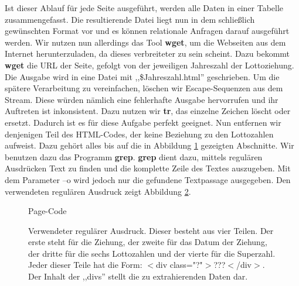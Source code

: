\documentclass[11pt,a4paper]{article}
\newcommand{\extname}[1]{\mbox{\textbf{#1}}}
\begin{document}
Ist dieser Ablauf für jede Seite ausgeführt, werden alle Daten in einer Tabelle zusammengefasst. Die resultierende Datei liegt nun in dem schließlich gewünschten Format vor und es können relationale Anfragen darauf ausgeführt werden.
\newline
\newline
Wir nutzen nun allerdings das Tool \extname{wget}, um die Webseiten aus dem Internet herunterzuladen, da dieses verbreiteter zu sein scheint. Dazu bekommt \extname{wget} die URL der Seite, gefolgt von der jeweiligen Jahreszahl der Lottoziehung. Die Ausgabe wird in eine Datei mit ,,\$Jahreszahl.html'' geschrieben.
\newline
\newline
Um die spätere Verarbeitung zu vereinfachen, löschen wir Escape-Sequenzen aus dem Stream. Diese würden nämlich eine fehlerhafte Ausgabe hervorrufen und ihr Auftreten ist inkonsistent. Dazu nutzen wir \extname{tr}, das einzelne Zeichen löscht oder ersetzt. Dadurch ist es für diese Aufgabe perfekt geeignet.
\newline
\newline
Nun entfernen wir denjenigen Teil des HTML-Codes, der keine Beziehung zu den Lottozahlen aufweist. Dazu gehört alles bis auf die in Abbildung \ref{page_code} gezeigten Abschnitte. Wir benutzen dazu das Programm \extname{grep}. \extname{grep} dient dazu, mittels regulären Ausdrücken Text zu finden und die komplette Zeile des Textes auszugeben. Mit dem Parameter –o wird jedoch nur die gefundene Textpassage ausgegeben. Den verwendeten regulären Ausdruck zeigt Abbildung \ref{regex}.
\begin{figure}[htbp]
  \centering
  \fbox{
    
  }
  \caption{Page-Code}
  \label{page_code}
\end{figure}
\begin{figure}[htbp]
  \centering
  \fbox{
    
  }
  \caption{Verwendeter regulärer Ausdruck. Dieser besteht aus vier Teilen. Der erste steht für die Ziehung, der zweite für das Datum der Ziehung, der dritte für die sechs Lottozahlen und der vierte für die Superzahl. Jeder dieser Teile hat die Form:
$<$div class="?"$>$???$<$/div$>$.
Der Inhalt der ,,divs'' stellt die zu extrahierenden Daten dar.
}
  \label{regex}
\end{figure}
\end{document}
